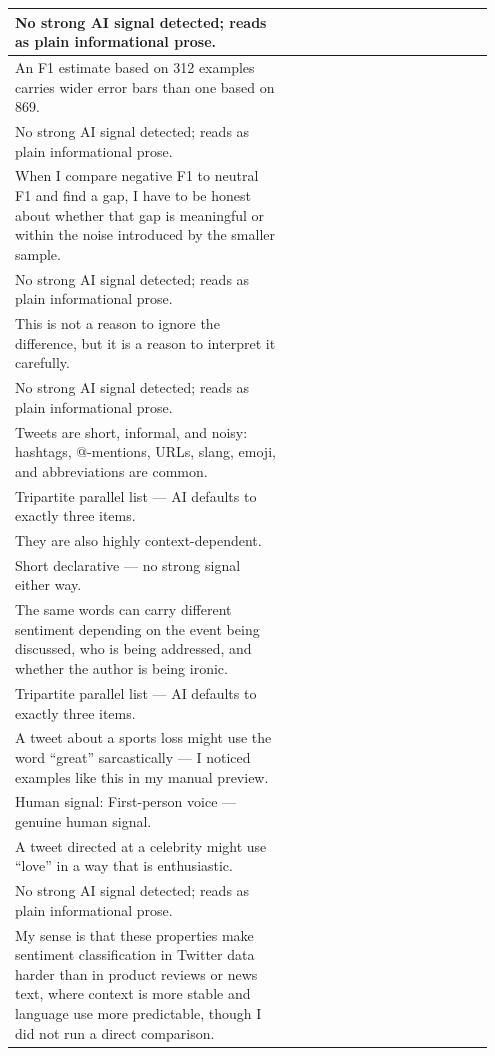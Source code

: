 \documentclass[11pt]{article}
\begin{document}
\begin{longtable}{|p{0.55\linewidth}|p{0.40\linewidth}|}
\hline
No strong AI signal detected; reads as plain informational prose. & \\
\hline
An F1 estimate based on 312 examples carries wider error bars than one based on 869. & \\[2pt]
\hline
No strong AI signal detected; reads as plain informational prose. & \\
\hline
When I compare negative F1 to neutral F1 and find a gap, I have to be honest about whether that gap is meaningful or within the noise introduced by the smaller sample. & \\[2pt]
\hline
No strong AI signal detected; reads as plain informational prose. & \\
\hline
This is not a reason to ignore the difference, but it is a reason to interpret it carefully. & \\[2pt]
\hline
No strong AI signal detected; reads as plain informational prose. & \\
\hline
Tweets are short, informal, and noisy: hashtags, @-mentions, URLs, slang, emoji, and abbreviations are common. & \\[2pt]
\hline
Tripartite parallel list --- AI defaults to exactly three items. & \\
\hline
They are also highly context-dependent. & \\[2pt]
\hline
Short declarative --- no strong signal either way. & \\
\hline
The same words can carry different sentiment depending on the event being discussed, who is being addressed, and whether the author is being ironic. & \\[2pt]
\hline
Tripartite parallel list --- AI defaults to exactly three items. & \\
\hline
A tweet about a sports loss might use the word ``great'' sarcastically --- I noticed examples like this in my manual preview. & \\[2pt]
\hline
Human signal: First-person voice --- genuine human signal. & \\
\hline
A tweet directed at a celebrity might use ``love'' in a way that is enthusiastic. & \\[2pt]
\hline
No strong AI signal detected; reads as plain informational prose. & \\
\hline
My sense is that these properties make sentiment classification in Twitter data harder than in product reviews or news text, where context is more stable and language use more predictable, though I did not run a direct comparison. & \\[2pt]

\end{longtable}
\end{document}
